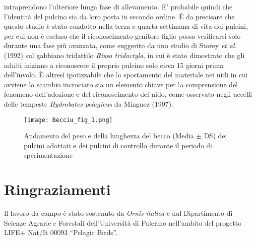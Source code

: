 intraprendono l{\textquoteright}ulteriore lunga fase di allevamento.
E{\textquoteright} probabile quindi che l{\textquoteright}identit\`a
del pulcino sia da loro posta in secondo ordine. \`E da precisare che
questo studio \`e stato condotto nella terza e quarta settimana di vita
dei pulcini, per cui non \`e escluso che il riconoscimento
genitore-figlio possa verificarsi solo durante una fase pi\`u avanzata,
come suggerito da uno studio di Storey \textit{et al. }(1992) sul
gabbiano tridattilo \textit{Rissa tridactyla}, in cui \`e stato
dimostrato che gli adulti iniziano a riconoscere il proprio pulcino
solo circa 15 giorni prima dell{\textquoteright}involo. \`E altres\`i
ipotizzabile che lo spostamento del materiale nei nidi in cui avviene
lo scambio incrociato sia un elemento chiave per la comprensione del
fenomeno dell{\textquoteright}adozione e del riconoscimento del nido,
come osservato negli uccelli delle tempeste \textit{Hydrobates
pelagicus} da Minguez (1997).


\begin{figure}[!h]
\centering
\texttt{[image: Becciu\_fig\_1.png]}
\caption{Andamento del peso e della lunghezza del becco (Media $\pm$ DS) dei pulcini adottati e dei pulcini di controllo durante il periodo di sperimentazione}
\label{Becciu_fig_1}
\end{figure}

\section*{Ringraziamenti}

Il lavoro da campo \`e stato sostenuto da \textit{Ornis italica} e dal
Dipartimento di Scienze Agrarie e Forestali
dell{\textquoteright}Universit\`a di Palermo
nell{\textquoteright}ambito del progetto LIFE+ Nat/It 00093
{\textquotedblleft}Pelagic Birds{\textquotedblright}.

